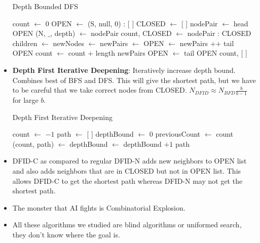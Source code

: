 \documentclass[a4paper]{article}
\begin{document}
\begin{itemize}
\begin{algorithm}[H]
        \caption{Depth Bounded DFS}\label{alg:AI-depth-DFS}
        \begin{algorithmic}[1]
            \State count $\gets$ 0
            \State OPEN $\gets$ (S, null, 0) : [ ]
            \State CLOSED $\gets$ [ ]
                \State nodePair $\gets$ head OPEN
                \State (N, $\_$, depth) $\gets$ nodePair
                    \State \Return count, 
                \EndIf
                \State CLOSED $\gets$ nodePair : CLOSED
                    \State children $\gets$ 
                    \State newNodes $\gets$ 
                    \State newPairs $\gets$ 
                    \State OPEN $\gets$ newPairs ++ tail OPEN
                    \State count $\gets$ count + length newPairs
                \Else
                    \State OPEN $\gets$ tail OPEN
                \EndIf
            \EndWhile
            \State \Return count, [ ]
        \end{algorithmic}
    \end{algorithm}
    \item \textbf{Depth First Iterative Deepening}: Iteratively increase depth bound. Combines best of BFS and DFS. This will give the shortest path, but we have to be careful that we take correct nodes from CLOSED. $N_{DFID}\approx N_{BFD}\frac{b}{b-1}$ for large $b$.
    \begin{algorithm}[H]
        \caption{Depth First Iterative Deepening}\label{alg:AI-depth-first-iterative}
        \begin{algorithmic}[1]
            \State count $\gets$ $-1$
            \State path $\gets$ [ ]
            \State depthBound $\gets$ $0$
            \Repeat
                \State previousCount $\gets$ count
                \State (count, path) $\gets$ 
                \State depthBound $\gets$ depthBound $+1$
            \State \Return path
        \end{algorithmic}
    \end{algorithm}
    \item DFID-C as compared to regular DFID-N adds new neighbors to OPEN list and also adds neighbors that are in CLOSED but not in OPEN list. This allows DFID-C to get the shortest path whereas DFID-N may not get the shortest path.
    \item The monster that AI fights is Combinatorial Explosion.
    \item All these algorithms we studied are blind algorithms or uniformed search, they don't know where the goal is.
\end{itemize}
\end{document}

